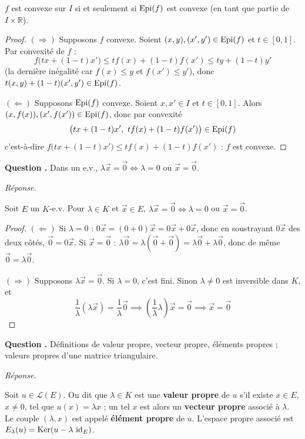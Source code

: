 \documentclass[11pt]{article}
\newcounter{qnum}
\newcommand{\question}[1]{%
\stepcounter{qnum}%
\bigskip
\noindent\textbf{Question \theqnum.} #1\par}
\newcommand{\reponse}{\noindent\textit{Réponse.}\ }
\begin{document}
\begin{prop}
$f$ est convexe sur $I$ si et seulement si $\operatorname{Epi}(f)$ est convexe (en tant que partie de $I\times\mathbb{R}$).
\end{prop}

\begin{proof}
$(\Rightarrow)$ Supposons $f$ convexe. Soient $(x,y),(x',y')\in\operatorname{Epi}(f)$ et $t\in[0,1]$. Par convexité de $f$ :
\[f\big(tx+(1-t)x'\big) \leq t f(x)+(1-t)f(x') \leq ty+(1-t)y'\]
(la dernière inégalité car $f(x)\leq y$ et $f(x')\leq y'$), donc $t(x,y)+(1-t)(x',y')\in\operatorname{Epi}(f)$.

$(\Leftarrow)$ Supposons $\operatorname{Epi}(f)$ convexe. Soient $x,x'\in I$ et $t\in[0,1]$. Alors $(x,f(x)),(x',f(x'))\in\operatorname{Epi}(f)$, donc par convexité
\[\big(tx+(1-t)x',\ tf(x)+(1-t)f(x')\big) \in \Epi(f)\]
c'est-à-dire $f\big(tx+(1-t)x'\big) \leq tf(x)+(1-t)f(x')$ : $f$ est convexe.
\end{proof}

\question{Dans un e.v., $\lambda\vec{x}=\vec{0} \iff \lambda=0$ ou $\vec{x}=\vec{0}$.}
\reponse
\begin{prop}
Soit $E$ un $K$-e.v. Pour $\lambda\in K$ et $\vec{x}\in E$, $\lambda\vec{x}=\vec{0} \iff \lambda=0$ ou $\vec{x}=\vec{0}$.
\end{prop}

\begin{proof}
$(\Leftarrow)$ Si $\lambda=0$ : $0\vec{x}=(0+0)\vec{x}=0\vec{x}+0\vec{x}$, donc en soustrayant $0\vec{x}$ des deux côtés, $\vec{0}=0\vec{x}$. Si $\vec{x}=\vec{0}$ : $\lambda\vec{0}=\lambda(\vec{0}+\vec{0})=\lambda\vec{0}+\lambda\vec{0}$, donc de même $\vec{0}=\lambda\vec{0}$.

$(\Rightarrow)$ Supposons $\lambda\vec{x}=\vec{0}$. Si $\lambda=0$, c'est fini. Sinon $\lambda\neq 0$ est inversible dans $K$, et
\[\frac{1}{\lambda}(\lambda\vec{x}) = \frac{1}{\lambda}\vec{0} \implies \left(\frac{1}{\lambda}\lambda\right)\vec{x}=\vec{0} \implies \vec{x}=\vec{0}\]
\end{proof}

\question{Définitions de valeur propre, vecteur propre, éléments propres ; valeurs propres d'une matrice triangulaire.}
\reponse
\begin{defi}
Soit $u\in\mathcal{L}(E)$. On dit que $\lambda\in K$ est une \textbf{valeur propre} de $u$ s'il existe $x\in E$, $x\neq 0$, tel que $u(x)=\lambda x$ ; un tel $x$ est alors un \textbf{vecteur propre} associé à $\lambda$. Le couple $(\lambda,x)$ est appelé \textbf{élément propre} de $u$. L'espace propre associé est $E_\lambda(u)=\operatorname{Ker}(u-\lambda\,\operatorname{id}_E)$.
\end{defi}
\end{document}
